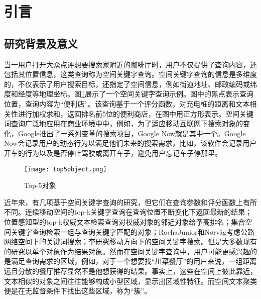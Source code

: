 \section{引言}

\subsection{研究背景及意义}
当一用户打开大众点评想要搜索家附近的咖啡厅时，用户不仅提供了查询内容，还包括其位置信息，这类查询称为空间关键字查询\cite{DBLP:conf/sigmod/ChenSM06,DBLP:journals/pvldb/CongJW09,DBLP:conf/icde/FelipeHR08, DBLP:conf/ssdbm/HariharanHLM07,DBLP:conf/dexa/KhodaeiSL10, DBLP:conf/cikm/ZhouXWGM05,DBLP:journals/tkde/LiLZLLW11,DBLP:conf/sigmod/LuLC11,DBLP:conf/ssd/RochaGJN11,DBLP:journals/vldb/WuCJ12,DBLP:journals/tkde/WuYCJ12,DBLP:journals/tods/WuYJ13}。空间关键字查询的信息是多维度的，不仅表示了用户搜索目标，还指定了空间信息，例如街道地址、邮政编码或纬度和经度等地理坐标。图\ref{top5object}展示了一个空间关键字查询示例。图中的黑点表示查询位置，查询内容为“便利店”。该查询基于一个评分函数，对充电桩的距离和文本相关性进行加权求和，返回排名前5位的便利商店，在图中用正方形表示。空间关键词查询广泛地应用在商业环境中中，例如，为了适应移动互联网下搜索对象的变化，Google推出了一系列变革的搜索项目，Google Now就是其中一个。Google Now会记录用户的动态行为以满足他们未来的搜索需求，比如，该软件会记录用户开车的行为以及是否停止驾驶或离开车子，避免用户忘记车子停那里。
\begin{figure}[htbp]
	\begin{center}
		\texttt{[image: top5object.png]}
		\caption{Top-5对象}
		\label{top5object}
	\end{center}
\end{figure}

近年来，有几项基于空间关键字查询的研究，但它们在查询参数和评分函数上有所不同。连续移动空间的top-k关键字查询\cite{DBLP:journals/tods/WuYJ13,DBLP:conf/icde/WuYJC11}在查询位置不断变化下返回最新的结果；位置感知型的top-k权威文本检索查询\cite{DBLP:journals/pvldb/CaoCJ10}对权威对象的邻近对象给予高排名；集合空间关键字查询\cite{DBLP:conf/sigmod/CaoCJO11}检索一组与查询关键字匹配的对象；RochaJunior和Nørvåg\cite{DBLP:conf/edbt/Rocha-JuniorN12}考虑公路网络空间下的关键词搜索；李\cite{DBLP:conf/icde/LiFX12}研究移动方向下的空间关键字搜索。但是大多数现有的研究以单个对象作为结果对象。然而在空间关键字查询中，用户可能更感兴趣的是满足查询需求的区域，例如，对于一个想要找“川菜餐厅”的用户来说，一组距离远且分散的餐厅推荐显然不是他想获得的结果。事实上，这些在空间上彼此靠近，文本相似的对象之间往往能够构成小型区域，显示出区域性特征。而空间文本聚类便是在无监督条件下找出这些区域，称为“簇”。

